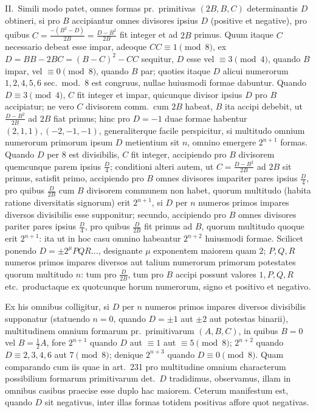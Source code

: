 \documentclass[12pt,a4paper]{article}
\theoremstyle{plain}
\theoremstyle{definition}
\theoremstyle{remark}
\begin{document}
II.\ Simili modo patet, omnes formas pr.\ primitivas $(2B, B, C)$ determinantis $D$ obtineri, si pro $B$ accipiantur omnes divisores ipsius $D$ (positive et negative), pro quibus $C = \tfrac{-(B^{2} - D)}{2B} = \tfrac{D - B^{2}}{2B}$ fit integer et ad $2B$ primus. Quum itaque $C$ necessario debeat esse impar, adeoque $CC \equiv 1 \pmod{8}$, ex $D = BB - 2BC = (B - C)^{2} - CC$ sequitur, $D$ esse vel $\equiv 3 \pmod{4}$, quando $B$ impar, vel $\equiv 0 \pmod{8}$, quando $B$ par; quoties itaque $D$ alicui numerorum $1, 2, 4, 5, 6$ sec.\ mod.\ $8$ est congruus, nullae huiusmodi formae dabuntur. Quando $D \equiv 3 \pmod{4}$, $C$ fit integer et impar, quicunque divisor ipsius $D$ pro $B$ accipiatur; ne vero $C$ divisorem comm.\ cum $2B$ habeat, $B$ ita accipi debebit, ut $\tfrac{D - B^{2}}{2B}$ ad $2B$ fiat primus; hinc pro $D = -1$ duae formae habentur $(2, 1, 1), (-2, -1, -1)$, generaliterque facile perspicitur, si multitudo omnium numerorum primorum ipsum $D$ metientium sit $n$, omnino emergere $2^{n+1}$ formas. Quando $D$ per $8$ est divisibilis, $C$ fit integer, accipiendo pro $B$ divisorem quemcunque parem ipsius $\tfrac{D}{4}$; conditioni alteri autem, ut $C = \tfrac{D - B^{2}}{2B}$ ad $2B$ sit primus, satisfit primo, accipiendo pro $B$ omnes divisores impariter pares ipsius $\tfrac{D}{4}$, pro quibus $\tfrac{D}{2B}$ cum $B$ divisorem communem non habet, quorum multitudo (habita ratione diversitatis signorum) erit $2^{n+1}$, si $D$ per $n$ numeros primos impares diversos divisibilis esse supponitur; secundo, accipiendo pro $B$ omnes divisores pariter pares ipsius $\tfrac{D}{4}$, pro quibus $\tfrac{D}{2B}$ fit primus ad $B$, quorum multitudo quoque erit $2^{n+1}$: ita ut in hoc casu omnino habeantur $2^{n+2}$ huiusmodi formae. Scilicet ponendo $D = \pm 2^{\mu}PQR\ldots$, designante $\mu$ exponentem maiorem quam $2$; $P, Q, R$ numeros primos impares diversos aut talium numerorum primorum potestates quorum multitudo $n$: tum pro $\tfrac{D}{2B}$, tum pro $B$ accipi possunt valores $1, P, Q, R$ etc.\ productaque ex quotcunque horum numerorum, signo et positivo et negativo.

Ex his omnibus colligitur, si $D$ per $n$ numeros primos impares diversos divisibilis supponatur (statuendo $n = 0$, quando $D = \pm 1$ aut $\pm 2$ aut potestas binarii), multitudinem omnium formarum pr.\ primitivarum $(A, B, C)$, in quibus $B = 0$ vel $B = \tfrac{1}{2}A$, fore $2^{n+1}$ quando $D$ aut $\equiv 1$ aut $\equiv 5 \pmod{8}$; $2^{n+2}$ quando $D \equiv 2, 3, 4, 6$ aut $7 \pmod{8}$; denique $2^{n+3}$ quando $D \equiv 0 \pmod{8}$. Quam comparando cum iis quae in art.\ 231 pro multitudine omnium characterum possibilium formarum primitivarum det.\ $D$ tradidimus, observamus, illam in omnibus casibus praecise esse duplo hac maiorem. Ceterum manifestum est, quando $D$ sit negativus, inter illas formas totidem positivas affore quot negativas.
\end{document}
